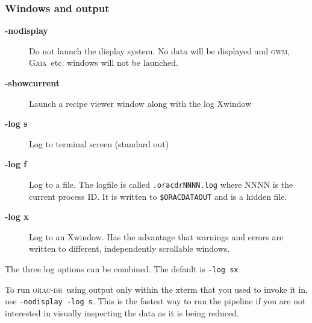 \documentclass[twoside,11pt]{article}
\newcommand{\xref}[3]{#1}
\newcommand{\xlabel}[1]{}
\renewcommand{\_}{\texttt{\symbol{95}}}
\newcommand{\oracdr}{\textsc{orac-dr}}
\newcommand{\gaia}{\xref{{\textsc{Gaia}}}{sun214}{}}
\newcommand{\gwm}{\xref{\textsc{gwm}}{sun219}{}}
\begin{document}
\subsubsection*{\xlabel{windows_and_output}Windows and output\label{oracdr_Windows_and_output}}
\begin{description}
\item[\textbf{-nodisplay}] \mbox{}

Do not launch the display system. No data will be displayed and \gwm,
\gaia\ etc. windows will not be launched.

\item[\textbf{-showcurrent}] \mbox{}

Launch a recipe viewer window along with the log Xwindow

\item[\textbf{-log s}] \mbox{}

Log to terminal screen (standard out)

\item[\textbf{-log f}] \mbox{}

Log to a file. The logfile is called \texttt{.oracdr\_NNNN.log} where NNNN 
is the current process ID. It is written to \texttt{\$ORAC\_DATA\_OUT} and is 
a hidden file.

\item[\textbf{-log x}] \mbox{}

Log to an Xwindow. Has the advantage that warnings and errors are
written to different, independently scrollable windows.

\end{description}


The three log options can be combined. The default is \texttt{-log sx}



To run \oracdr\ using output only within the xterm that you used
to invoke it in, use \texttt{-nodisplay -log s}. This is the fastest way
to run the pipeline if you are not interested in visually
inspecting the data as it is being reduced.
\end{document}
